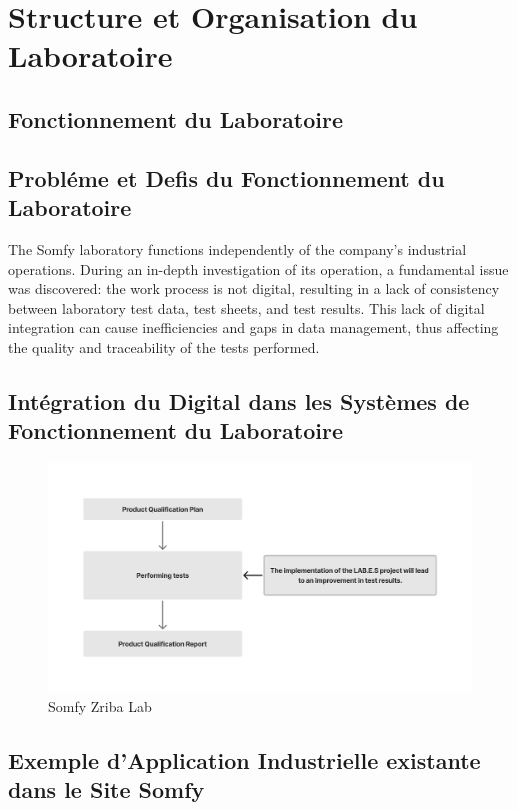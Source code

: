 \section{ Structure et Organisation du Laboratoire}


\subsection{Fonctionnement du Laboratoire}


\subsection{Probléme et Defis du Fonctionnement du Laboratoire}

The Somfy laboratory functions independently of the company's industrial operations. During an in-depth investigation of its operation, a fundamental issue was discovered: the work process is not digital, resulting in a lack of consistency between laboratory test data, test sheets, and test results. This lack of digital integration can cause inefficiencies and gaps in data management, thus affecting the quality and traceability of the tests performed.


\subsection{Intégration du Digital dans les Systèmes de Fonctionnement du Laboratoire}

\begin{figure}[H]
    \centering
    \includegraphics[width=1\textwidth]{chapters/2/img/User Flows (2).png}
    \caption{Somfy Zriba Lab}
    \label{fig:campus}
\end{figure}

\subsection{Exemple d'Application Industrielle existante dans le Site Somfy}

